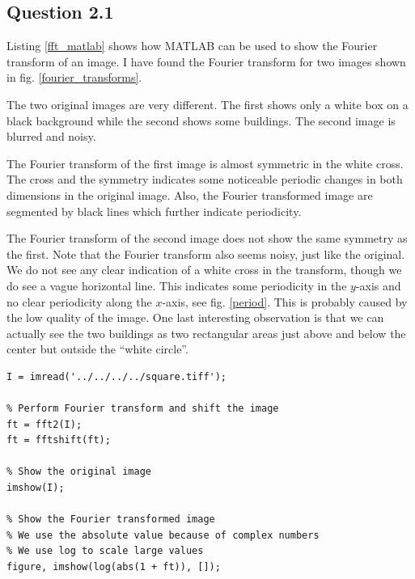 \documentclass[a4paper, 10pt, final]{article}
\title{\mytitle}
\subtitle{\mysubtitle}
\author{\myauthor{} - \mymail}
\date{\mydate}
\begin{document}
\maketitle

\subsection*{Question 2.1}
Listing \ref{fft_matlab} shows how MATLAB can be used to show the
Fourier transform of an image. I have found the Fourier transform for
two images shown in fig. \ref{fourier_transforms}.

The two original images are very different. The first shows only a white
box on a black background while the second shows some buildings. The
second image is blurred and noisy.

The Fourier transform of the first image is almost symmetric in the
white cross. The cross and the symmetry indicates some noticeable
periodic changes in both dimensions in the original image. Also, the
Fourier transformed image are segmented by black lines which further
indicate periodicity.

The Fourier transform of the second image does not show the same
symmetry as the first. Note that the Fourier transform also seems noisy,
just like the original. We do not see any clear indication of a white
cross in the transform, though we do see a vague horizontal line. This
indicates some periodicity in the $y$-axis and no clear periodicity
along the $x$-axis, see fig. \ref{period}. This is probably caused by
the low quality of the image. One last interesting observation is that
we can actually see the two buildings as two rectangular areas just
above and below the center but outside the ``white circle''.

\begin{lstlisting}[caption={Calculating and showing the Fourier
    transform of an image using MATLAB.}, captionpos=b,
    label={fft_matlab}, float=b, numbers=none]
% Read the original image
I = imread('../../../../square.tiff');

% Perform Fourier transform and shift the image
ft = fft2(I);
ft = fftshift(ft);

% Show the original image
imshow(I);

% Show the Fourier transformed image
% We use the absolute value because of complex numbers
% We use log to scale large values
figure, imshow(log(abs(1 + ft)), []);
\end{lstlisting}
\end{document}
